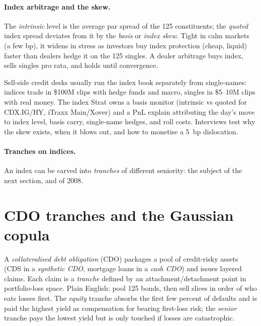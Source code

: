 \paragraph{Index arbitrage and the skew.}  The \emph{intrinsic}
level is the average par spread of the 125 constituents; the
\emph{quoted} index spread deviates from it by the \emph{basis} or
\emph{index skew}.  Tight in calm markets (a few bp), it widens in
stress as investors buy index protection (cheap, liquid) faster
than dealers hedge it on the 125 singles.  A dealer arbitrage buys
index, sells singles pro rata, and holds until convergence.

\begin{gsbox}[title={The index trading desk}]
Sell-side credit desks usually run the index book separately from
single-names: indices trade in \$100M clips with hedge funds and
macro, singles in \$5--10M clips with real money.  The index Strat
owns a basis monitor (intrinsic vs quoted for CDX.IG/HY, iTraxx
Main/Xover) and a PnL explain attributing the day's move to index
level, basis carry, single-name hedges, and roll costs.  Interviews
test why the skew exists, when it blows out, and how to monetise a
5~bp dislocation.
\end{gsbox}

\paragraph{Tranches on indices.}  An index can be carved into
\emph{tranches} of different seniority: the subject of the next
section, and of 2008.


\section{CDO tranches and the Gaussian copula}
\label{sec:cdo_copula}

A \emph{collateralised debt obligation} (CDO) packages a pool of
credit-risky assets (CDS in a \emph{synthetic CDO}, mortgage loans
in a \emph{cash CDO}) and issues layered claims.  Each claim is a
\emph{tranche} defined by an attachment/detachment point in
portfolio-loss space.  Plain English: pool 125 bonds, then sell
slices in order of who eats losses first.  The \emph{equity}
tranche absorbs the first few percent of defaults and is paid the
highest yield as compensation for bearing first-loss risk; the
\emph{senior} tranche pays the lowest yield but is only touched if
losses are catastrophic.

